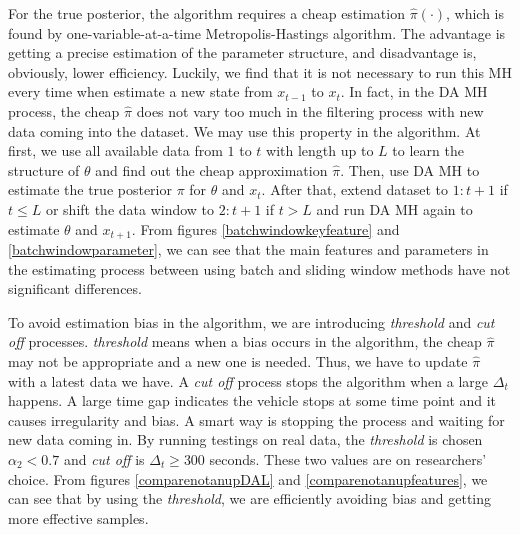 For the true posterior, the algorithm requires a cheap estimation $\hat{\pi}(\cdot)$, which is found by one-variable-at-a-time Metropolis-Hastings algorithm. The advantage is getting a precise estimation of the parameter structure, and disadvantage is, obviously, lower efficiency. Luckily, we find that it is not necessary to run this MH every time when estimate a new state from $x_{t-1}$ to $x_t$. In fact, in the DA MH process, the cheap $\hat{\pi}$ does not vary too much in the filtering process with new data coming into the dataset. We may use this property in the algorithm. At first, we use all available data from $1$ to $t$ with length up to $L$ to learn the structure of $\theta$ and find out the cheap approximation $\hat{\pi}$. Then, use DA MH to estimate the true posterior $\pi$ for $\theta$ and $x_t$. After that, extend dataset to $1:t+1$ if $t\leq L$ or shift the data window to $2:t+1$ if $t>L$ and run DA MH again to estimate $\theta$ and $x_{t+1}$. From figures \ref{batchwindowkeyfeature} and \ref{batchwindowparameter}, we can see that the main features and parameters in the estimating process between using batch and sliding window methods have not significant differences. 


To avoid estimation bias in the algorithm, we are introducing \textit{threshold} and \textit{cut off} processes. \textit{threshold} means when a bias occurs in the algorithm, the cheap $\hat{\pi}$ may not be appropriate and a new one is needed. Thus, we have to update $\hat{\pi}$ with a latest data we have. A \textit{cut off} process stops the algorithm when a large $\Delta_t$ happens. A large time gap indicates the vehicle stops at some time point and it causes irregularity and bias. A smart way is stopping the process and waiting for new data coming in. By running testings on real data, the \textit{threshold} is chosen $\alpha_2<0.7$ and \textit{cut off} is $\Delta_t\geq 300$ seconds. These two values are on researchers' choice. From figures \ref{comparenotanupDAL} and  \ref{comparenotanupfeatures}, we can see that by using the \textit{threshold}, we are efficiently avoiding bias and getting more effective samples. 


 
